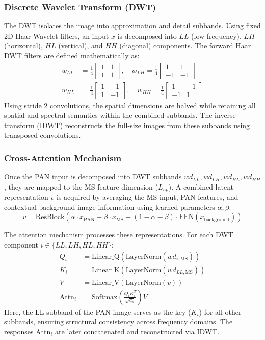 \documentclass[11pt]{article}
\begin{document}
\subsubsection{Discrete Wavelet Transform (DWT)}
The DWT isolates the image into approximation and detail subbands. Using fixed 2D Haar Wavelet filters, an input $x$ is decomposed into $LL$ (low-frequency), $LH$ (horizontal), $HL$ (vertical), and $HH$ (diagonal) components.
The forward Haar DWT filters are defined mathematically as:
\begin{align*}
    w_{LL} &= \frac{1}{4} \begin{bmatrix} 1 & 1 \\ 1 & 1 \end{bmatrix}, \quad
    w_{LH} = \frac{1}{4} \begin{bmatrix} 1 & 1 \\ -1 & -1 \end{bmatrix} \\
    w_{HL} &= \frac{1}{4} \begin{bmatrix} 1 & -1 \\ 1 & -1 \end{bmatrix}, \quad
    w_{HH} = \frac{1}{4} \begin{bmatrix} 1 & -1 \\ -1 & 1 \end{bmatrix}
\end{align*}
Using stride 2 convolutions, the spatial dimensions are halved while retaining all spatial and spectral semantics within the combined subbands. The inverse transform (IDWT) reconstructs the full-size images from these subbands using transposed convolutions.

\subsubsection{Cross-Attention Mechanism}
Once the PAN input is decomposed into DWT subbands $wd_{LL}, wd_{LH}, wd_{HL}, wd_{HH}$, they are mapped to the MS feature dimension ($L_{up}$). A combined latent representation $v$ is acquired by averaging the MS input, PAN features, and contextual background image information using learned parameters $\alpha, \beta$:
\[ v = \text{ResBlock}(\alpha \cdot x_{\text{PAN}} + \beta \cdot x_{\text{MS}} + (1 - \alpha - \beta) \cdot \text{FFN}(x_{\text{background}})) \]

The attention mechanism processes these representations. For each DWT component $i \in \{LL, LH, HL, HH\}$:
\begin{align*}
    Q_i &= \text{Linear\_Q}(\text{LayerNorm}(wd_{i,\text{MS}})) \\
    K_i &= \text{Linear\_K}(\text{LayerNorm}(wd_{LL,\text{MS}})) \\
    V   &= \text{Linear\_V}(\text{LayerNorm}(v)) \\
    \text{Attn}_i &= \text{Softmax}\left(\frac{Q_i K_i^T}{\sqrt{d_k}}\right) V
\end{align*}
Here, the LL subband of the PAN image serves as the key ($K_i$) for all other subbands, ensuring structural consistency across frequency domains. The responses $\text{Attn}_i$ are later concatenated and reconstructed via IDWT.
\end{document}
